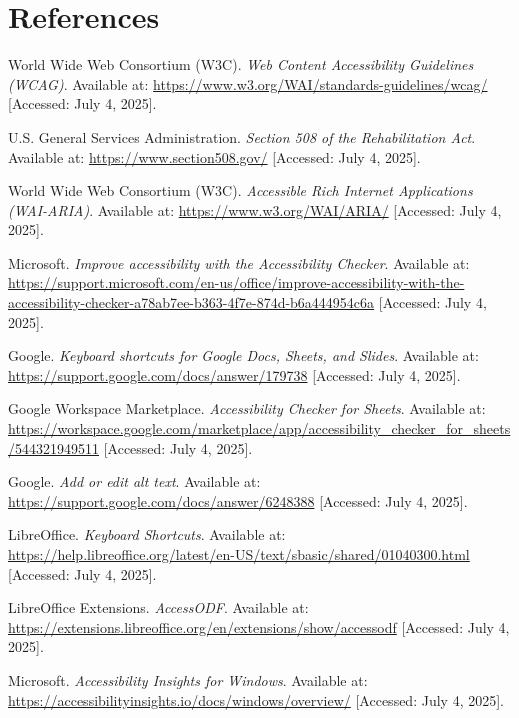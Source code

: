 \section{References}
\begin{thebibliography}{99}

 World Wide Web Consortium (W3C). \textit{Web Content Accessibility Guidelines (WCAG)}. Available at: \url{https://www.w3.org/WAI/standards-guidelines/wcag/} [Accessed: July 4, 2025].

 U.S. General Services Administration. \textit{Section 508 of the Rehabilitation Act}. Available at: \url{https://www.section508.gov/} [Accessed: July 4, 2025].

 World Wide Web Consortium (W3C). \textit{Accessible Rich Internet Applications (WAI-ARIA)}. Available at: \url{https://www.w3.org/WAI/ARIA/} [Accessed: July 4, 2025].

 Microsoft. \textit{Improve accessibility with the Accessibility Checker}. Available at: \url{https://support.microsoft.com/en-us/office/improve-accessibility-with-the-accessibility-checker-a78ab7ee-b363-4f7e-874d-b6a444954c6a} [Accessed: July 4, 2025].

 Google. \textit{Keyboard shortcuts for Google Docs, Sheets, and Slides}. Available at: \url{https://support.google.com/docs/answer/179738} [Accessed: July 4, 2025].

 Google Workspace Marketplace. \textit{Accessibility Checker for Sheets}. Available at: \url{https://workspace.google.com/marketplace/app/accessibility_checker_for_sheets/544321949511} [Accessed: July 4, 2025].

 Google. \textit{Add or edit alt text}. Available at: \url{https://support.google.com/docs/answer/6248388} [Accessed: July 4, 2025].

 LibreOffice. \textit{Keyboard Shortcuts}. Available at: \url{https://help.libreoffice.org/latest/en-US/text/sbasic/shared/01040300.html} [Accessed: July 4, 2025].

 LibreOffice Extensions. \textit{AccessODF}. Available at: \url{https://extensions.libreoffice.org/en/extensions/show/accessodf} [Accessed: July 4, 2025].

 Microsoft. \textit{Accessibility Insights for Windows}. Available at: \url{https://accessibilityinsights.io/docs/windows/overview/} [Accessed: July 4, 2025].


\end{thebibliography}

